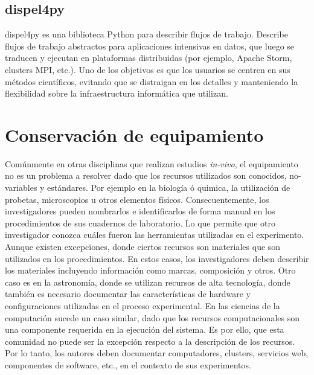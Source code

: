 \subsection{dispel4py}
dispel4py \cite{DBLP:conf/eScience/FilgueiraKAKSS15}  es una biblioteca Python para describir flujos de trabajo. 
 Describe flujos de trabajo abstractos para aplicaciones intensivas en datos, que luego se traducen y ejecutan en plataformas distribuidas (por ejemplo, Apache Storm, clusters MPI, etc.).
Uno de los objetivos es que los usuarios se centren en sus métodos científicos, evitando que se distraigan en los detalles y manteniendo la flexibilidad sobre la infraestructura informática que utilizan. 


\section{Conservación de equipamiento}
Comúnmente en otras disciplinas que realizan estudios \emph{in-vivo}, el equipamiento no es un problema a resolver dado que los recursos utilizados son conocidos, no-variables y estándares. Por ejemplo en la biología ó quimica, la utilización de probetas, microscopios u otros elementos físicos. 
Consecuentemente, los investigadores pueden nombrarlos e identificarlos de forma manual en los procedimientos de sus cuadernos de laboratorio. Lo que permite que otro investigador conozca cuáles fueron las herramientas utilizadas en el experimento.
Aunque existen excepciones, donde ciertos recursos son materiales que son utilizados en los procedimientos. En estos casos, los investigadores deben describir los materiales incluyendo información como marcas, composición y otros. 
Otro caso es en la astronomía, donde se utilizan recursos de alta tecnología, donde también es necesario documentar las características de hardware y configuraciones utilizadas en el proceso experimental. 
En las ciencias de la computación sucede un caso similar, dado que los recursos computacionales son una componente requerida en la ejecución del sistema. 
Es por ello, que esta comunidad no puede ser la excepción respecto a la descripción de los recursos. Por lo tanto, los autores deben documentar computadores, clusters, servicios web, componentes de software, etc., en el contexto de sus experimentos.

